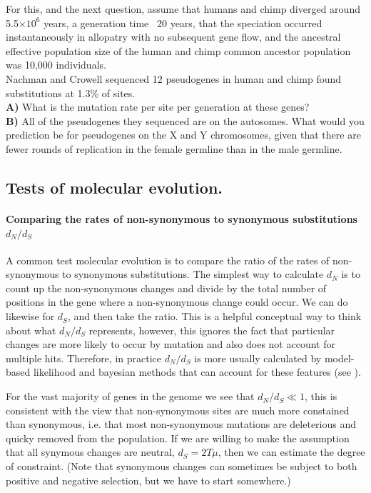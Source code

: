 \begin{question}
For this, and the next question, assume that humans and chimp diverged
around 5.5$\times 10^6$ years, a generation time ~20 years, that the speciation occurred instantaneously in allopatry with no subsequent gene flow, and the ancestral effective population size of the human and chimp common ancestor population was 10,000 individuals.\\
Nachman and Crowell sequenced 12 pseudogenes in human and chimp found substitutions at 1.3\% of sites. \\
{\bf A) } What is the mutation rate per site per generation at these genes?\\
{\bf B)} All of the pseudogenes they sequenced are on the autosomes. What
would you prediction be for pseudogenes on the X and Y chromosomes,
given that there are fewer rounds of replication in the female
germline than in the male germline.
\end{question}

\subsection{Tests of molecular evolution.}

\paragraph{Comparing the rates of non-synonymous to synonymous
substitutions $d_N/d_S$}
A common test molecular evolution is to compare the ratio of the rates of non-synonymous to synonymous
substitutions. The simplest way to calculate $d_N$ is to 
count up the non-synonymous changes and divide by the total number of
positions in the gene where a non-synonymous change could occur. We
can do likewise for $d_S$, and then take the ratio. This is a helpful
conceptual way to think about what $d_N/d_S$ represents, however, this
ignores the fact that particular changes are more likely to occur by
mutation and also does not account for multiple hits. Therefore, in
practice $d_N/d_S$ is more usually calculated by model-based
likelihood and bayesian methods
that can account for these features (see ). 

For the vast majority of genes in the genome we see that $d_N/d_S \ll 1$, this is consistent with the view
that non-synonymous sites are much more constained than synonymous,
i.e. that most non-synonymous mutations are deleterious and quicky
removed from the population. If we are willing to make the assumption that all synymous changes are
neutral, $d_S=2T \mu$, then we can estimate the degree of constraint. (Note that synonymous changes can sometimes be subject to
both positive and negative selection, but we have to start somewhere.) 

